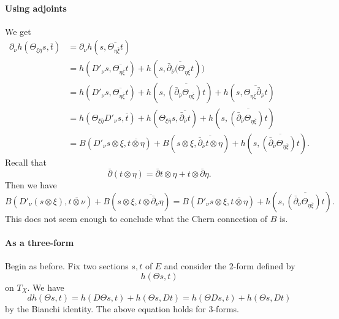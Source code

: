 \documentclass{article}
\begin{document}
\paragraph{Using adjoints}

We get
\begin{align*}
\partial_\nu h(\Theta_{\xi \overline\eta} s, \overline t)
&= \partial_\nu h(s, \overline{\Theta_{\eta \overline\xi} t})
\\
&= h(D'_\nu s, \overline{\Theta_{\eta\overline\xi} t}) + h(s, \overline{\bar\partial_{\overline\nu}(\Theta_{\eta \overline \xi} t}))
\\
&= h(D'_\nu s, \overline{\Theta_{\eta\overline\xi} t})
+ h(s, \overline{(\bar\partial_{\overline\nu}\Theta_{\eta \overline\xi}) t})
+ h(s, \overline{\Theta_{\eta \overline\xi} \bar\partial_{\overline\nu} t})
\\
&= h(\Theta_{\xi \overline\eta} D'_\nu s, \overline{t})
+ h(\Theta_{\xi \overline\eta} s, \overline{\bar\partial_{\overline\nu} t})
+ h(s, \overline{(\bar\partial_{\overline\nu}\Theta_{\eta \overline\xi}) t})
\\
&= B(D'_\nu s \otimes \xi, \overline{t \otimes \eta})
+ B(s \otimes \xi, \overline{\bar\partial_{\overline \nu}t \otimes \eta})
+ h(s, \overline{(\bar\partial_{\overline\nu}\Theta_{\eta \overline\xi}) t}).
\end{align*}
Recall that
$$
\bar\partial(t \otimes \eta)
= \bar\partial t \otimes \eta + t \otimes \bar\partial \eta.
$$
Then we have
$$
B(D'_\nu(s \otimes \xi), \overline{t \otimes \nu})
+ B(s \otimes \xi, \overline{t \otimes \bar\partial_{\overline\nu} \eta})
= B(D'_\nu s \otimes \xi, \overline{t \otimes \eta})
+ h(s, \overline{(\bar\partial_{\overline\nu}\Theta_{\eta \overline\xi}) t}).
$$
This does not seem enough to conclude what the Chern connection of $B$ is.


\paragraph{As a three-form}

Begin as before. Fix two sections $s, t$ of $E$ and consider the $2$-form defined by
$$
h(\Theta s, t)
$$
on $T_X$. We have
$$
d h(\Theta s, t)
= h(D \Theta s, t) + h(\Theta s, D t)
= h(\Theta D s, t) + h(\Theta s, D t)
$$
by the Bianchi identity. The above equation holds for $3$-forms.
\end{document}
